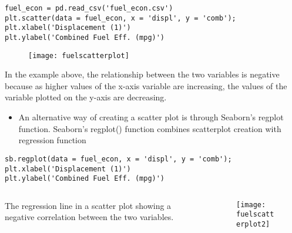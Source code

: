 \documentclass[12pt]{beamer}
\begin{document}
    \begin{frame}[fragile]{}
    \begin{verbatim}
fuel_econ = pd.read_csv('fuel_econ.csv')
plt.scatter(data = fuel_econ, x = 'displ', y = 'comb');
plt.xlabel('Displacement (1)')
plt.ylabel('Combined Fuel Eff. (mpg)')
    \end{verbatim}
    \begin{figure}
    	\centering
    	\texttt{[image: fuelscatterplot]}
    \end{figure}
In the example above, the relationship between the two variables is negative because as higher values of the x-axis variable are increasing, the values of the variable plotted on the y-axis are decreasing.
    \end{frame}
    \begin{frame}[fragile]{}
    	\begin{itemize}
    		\item An alternative way of creating a scatter plot is through Seaborn's regplot function. Seaborn's regplot() function combines scatterplot creation with regression function
    	\end{itemize}
      \begin{verbatim}
sb.regplot(data = fuel_econ, x = 'displ', y = 'comb');
plt.xlabel('Displacement (1)')
plt.ylabel('Combined Fuel Eff. (mpg)')
    \end{verbatim}
    \begin{columns}
	\begin{column}{0.4\textwidth}
		The regression line in a scatter plot showing a negative correlation between the two variables.
	\end{column}
    \begin{column}{0.6\textwidth}
    	\begin{figure}
    		\centering
    		\texttt{[image: fuelscatterplot2]}
    	\end{figure}
    \end{column}
    \end{columns}
    \end{frame}
\end{document}
